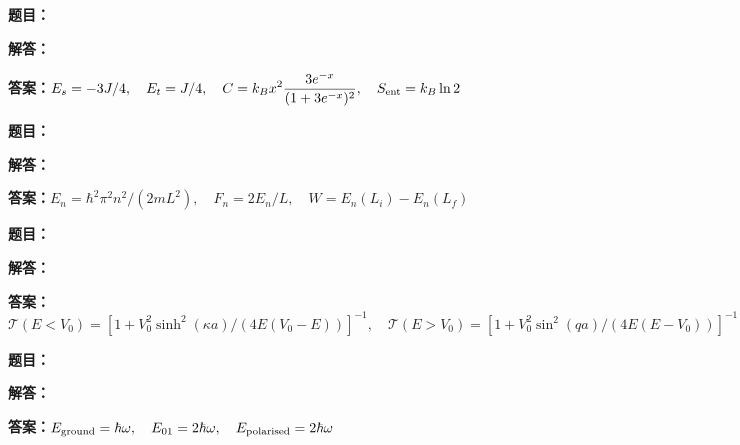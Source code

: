 \documentclass[lang=cn,color=blue,11pt]{elegantbook}
\begin{document}
\par\smallskip\noindent\hrulefill\par\medskip
{}\par
\noindent\textbf{题目：}
\par\noindent\textbf{解答：}
\par\noindent\textbf{答案：}\(\displaystyle E_s=-3J/4,\quad E_t=J/4,\quad C=k_Bx^2\frac{3e^{-x}}{(1+3e^{-x})^2},\quad S_{\rm ent}=k_B\ln2\)\par
\par\smallskip\noindent\hrulefill\par\medskip
{}\par
\noindent\textbf{题目：}
\par\noindent\textbf{解答：}
\par\noindent\textbf{答案：}\(\displaystyle E_n=\hbar^2\pi^2n^2/(2mL^2),\quad F_n=2E_n/L,\quad W=E_n(L_i)-E_n(L_f)\)\par
\par\smallskip\noindent\hrulefill\par\medskip
{}\par
\noindent\textbf{题目：}
\par\noindent\textbf{解答：}
\par\noindent\textbf{答案：}\(\displaystyle \mathcal T(E<V_0)=[1+V_0^2\sinh^2(\kappa a)/(4E(V_0-E))]^{-1},\quad\mathcal T(E>V_0)=[1+V_0^2\sin^2(qa)/(4E(E-V_0))]^{-1}\)\par
\par\smallskip\noindent\hrulefill\par\medskip
{}\par
\noindent\textbf{题目：}
\par\noindent\textbf{解答：}
\par\noindent\textbf{答案：}\(\displaystyle E_{\rm ground}=\hbar\omega,\quad E_{01}=2\hbar\omega,\quad E_{\rm polarised}=2\hbar\omega\)\par
\end{document}
